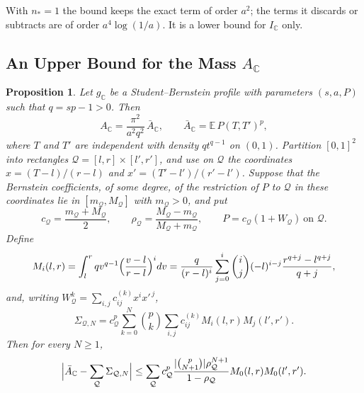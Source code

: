 \documentclass[11pt]{amsart}
\numberwithin{equation}{section}
\newtheorem{proposition}[equation]{Proposition}
\theoremstyle{definition}
\theoremstyle{remark}
\newcommand{\C}{\mathbb C}
\begin{document}
With $n_*=1$ the bound keeps the exact term of order $a^2$; the terms it
discards or subtracts are of order $a^4\log(1/a)$. It is a lower bound
for $I_\C$ only.

\subsection{\texorpdfstring{An Upper Bound for the Mass $A_\C$}{An Upper Bound for the Mass}}

\begin{proposition}\label{pf:mass}
Let $g_\C$ be a Student--Bernstein profile with parameters $(s,a,P)$
such that $q=sp-1>0$. Then
\begin{equation}\label{pf:polynomial-mass}
 A_\C=\frac{\pi^2}{a^2q^2}\,\bar A_\C,\qquad
 \bar A_\C=\mathbb E\,P(T,T')^p,
\end{equation}
where $T$ and $T'$ are independent with density $qt^{q-1}$ on $(0,1)$.
Partition $[0,1]^2$ into rectangles $\mathcal Q=[l,r]\times[l',r']$, and
use on $\mathcal Q$ the coordinates $x=(T-l)/(r-l)$ and
$x'=(T'-l')/(r'-l')$. Suppose that the Bernstein coefficients, of some
degree, of the restriction of $P$ to $\mathcal Q$ in these coordinates
lie in $[m_{\mathcal Q},M_{\mathcal Q}]$ with $m_{\mathcal Q}>0$, and
put
\[
 c_{\mathcal Q}=\frac{m_{\mathcal Q}+M_{\mathcal Q}}2,\qquad
 \rho_{\mathcal Q}=\frac{M_{\mathcal Q}-m_{\mathcal Q}}
 {M_{\mathcal Q}+m_{\mathcal Q}},\qquad
 P=c_{\mathcal Q}(1+W_{\mathcal Q})\ \text{on }\mathcal Q .
\]
Define
\begin{equation}\label{pf:subrectangle-moments}
 M_i(l,r)=\int_l^rqv^{q-1}\Bigl(\frac{v-l}{r-l}\Bigr)^idv
 =\frac q{(r-l)^i}\sum_{j=0}^i\binom ij(-l)^{i-j}
 \frac{r^{q+j}-l^{q+j}}{q+j},
\end{equation}
and, writing $W_{\mathcal Q}^k=\sum_{i,j}c^{(k)}_{ij}x^ix'^{\,j}$,
\[
 \Sigma_{\mathcal Q,N}=c_{\mathcal Q}^p\sum_{k=0}^N\binom pk
 \sum_{i,j}c^{(k)}_{ij}M_i(l,r)M_j(l',r').
\]
Then for every $N\ge1$,
\begin{equation}\label{pf:subrectangle-mass}
 \Bigl|\bar A_\C-\sum_{\mathcal Q}\Sigma_{\mathcal Q,N}\Bigr|
 \le\sum_{\mathcal Q}c_{\mathcal Q}^p
 \frac{|\binom p{N+1}|\rho_{\mathcal Q}^{N+1}}{1-\rho_{\mathcal Q}}
 M_0(l,r)M_0(l',r').
\end{equation}
\end{proposition}
\end{document}
